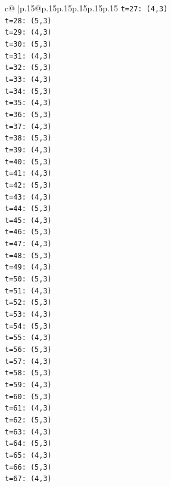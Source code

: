 \documentclass{article}
\begin{document}
{\begin{supertabular}{c@{$\;$}|p{.15\linewidth}@{}p{.15\linewidth}p{.15\linewidth}p{.15\linewidth}p{.15\linewidth}p{.15\linewidth}}
{{{\texttt{t=27: (4,3)} \\
\texttt{t=28: (5,3)} \\
\texttt{t=29: (4,3)} \\
\texttt{t=30: (5,3)} \\
\texttt{t=31: (4,3)} \\
\texttt{t=32: (5,3)} \\
\texttt{t=33: (4,3)} \\
\texttt{t=34: (5,3)} \\
\texttt{t=35: (4,3)} \\
\texttt{t=36: (5,3)} \\
\texttt{t=37: (4,3)} \\
\texttt{t=38: (5,3)} \\
\texttt{t=39: (4,3)} \\
\texttt{t=40: (5,3)} \\
\texttt{t=41: (4,3)} \\
\texttt{t=42: (5,3)} \\
\texttt{t=43: (4,3)} \\
\texttt{t=44: (5,3)} \\
\texttt{t=45: (4,3)} \\
\texttt{t=46: (5,3)} \\
\texttt{t=47: (4,3)} \\
\texttt{t=48: (5,3)} \\
\texttt{t=49: (4,3)} \\
\texttt{t=50: (5,3)} \\
\texttt{t=51: (4,3)} \\
\texttt{t=52: (5,3)} \\
\texttt{t=53: (4,3)} \\
\texttt{t=54: (5,3)} \\
\texttt{t=55: (4,3)} \\
\texttt{t=56: (5,3)} \\
\texttt{t=57: (4,3)} \\
\texttt{t=58: (5,3)} \\
\texttt{t=59: (4,3)} \\
\texttt{t=60: (5,3)} \\
\texttt{t=61: (4,3)} \\
\texttt{t=62: (5,3)} \\
\texttt{t=63: (4,3)} \\
\texttt{t=64: (5,3)} \\
\texttt{t=65: (4,3)} \\
\texttt{t=66: (5,3)} \\
\texttt{t=67: (4,3)} \\
}}}
\end{supertabular}}
\end{document}
